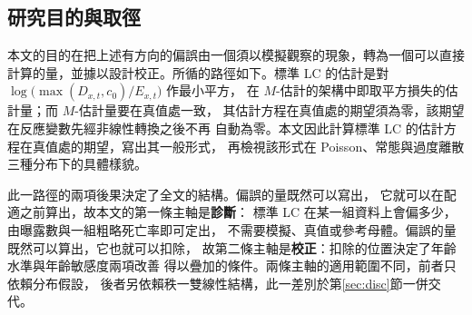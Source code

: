 \subsection{研究目的與取徑}\label{subsec:design}

本文的目的在把上述有方向的偏誤由一個須以模擬觀察的現象，轉為一個可以直接
計算的量，並據以設計校正。所循的路徑如下。標準 LC 的估計是對
$\log\bigl(\max(D_{x,t},c_0)/E_{x,t}\bigr)$ 作最小平方，
在 $M$-估計的架構中即取平方損失的估計量；而 $M$-估計量要在真值處一致，
其估計方程在真值處的期望須為零，該期望在反應變數先經非線性轉換之後不再
自動為零。本文因此計算標準 LC 的估計方程在真值處的期望，寫出其一般形式，
再檢視該形式在 Poisson、常態與過度離散三種分布下的具體樣貌。

此一路徑的兩項後果決定了全文的結構。偏誤的量既然可以寫出，
它就可以在配適之前算出，故本文的第一條主軸是\textbf{診斷}：
標準 LC 在某一組資料上會偏多少，由曝露數與一組粗略死亡率即可定出，
不需要模擬、真值或參考母體。偏誤的量既然可以算出，它也就可以扣除，
故第二條主軸是\textbf{校正}：扣除的位置決定了年齡水準與年齡敏感度兩項改善
得以疊加的條件。兩條主軸的適用範圍不同，前者只依賴分布假設，
後者另依賴秩一雙線性結構，此一差別於第\ref{sec:disc}節一併交代。


